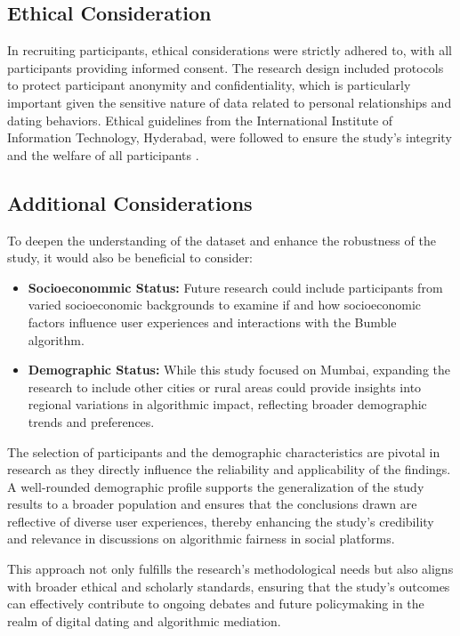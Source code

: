 \subsection{Ethical Consideration}
In recruiting participants, ethical considerations were strictly adhered to, with all participants providing informed consent. The research design included protocols to protect participant anonymity and confidentiality, which is particularly important given the sensitive nature of data related to personal relationships and dating behaviors. Ethical guidelines from the International Institute of Information Technology, Hyderabad, were followed to ensure the study’s integrity and the welfare of all participants \cite{Kalra_Gupta_Varghese_Rangaswamy_2023}.

\subsection{Additional Considerations}
To deepen the understanding of the dataset and enhance the robustness of the study, it would also be beneficial to consider:

\begin{itemize}
    \item \textbf{Socioeconommic Status:} Future research could include participants from varied socioeconomic backgrounds to examine if and how socioeconomic factors influence user experiences and interactions with the Bumble algorithm.
    \item \textbf{Demographic Status:} While this study focused on Mumbai, expanding the research to include other cities or rural areas could provide insights into regional variations in algorithmic impact, reflecting broader demographic trends and preferences.
\end{itemize}


The selection of participants and the demographic characteristics are pivotal in research as they directly influence the reliability and applicability of the findings. A well-rounded demographic profile supports the generalization of the study results to a broader population and ensures that the conclusions drawn are reflective of diverse user experiences, thereby enhancing the study’s credibility and relevance in discussions on algorithmic fairness in social platforms.

This approach not only fulfills the research’s methodological needs but also aligns with broader ethical and scholarly standards, ensuring that the study’s outcomes can effectively contribute to ongoing debates and future policymaking in the realm of digital dating and algorithmic mediation.

